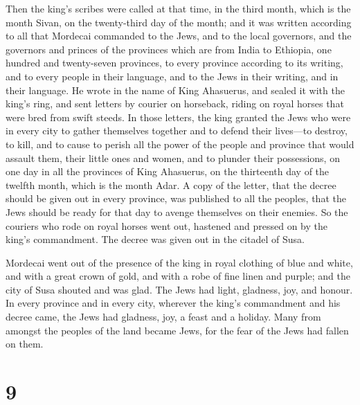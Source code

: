  Then the king's scribes were called at that time, in the
third month, which is the month Sivan, on the twenty-third day of the
month; and it was written according to all that Mordecai commanded to
the Jews, and to the local governors, and the governors and princes of
the provinces which are from India to Ethiopia, one hundred and
twenty-seven provinces, to every province according to its writing, and
to every people in their language, and to the Jews in their writing, and
in their language.  He wrote in the name of King
Ahasuerus, and sealed it with the king's ring, and sent letters by
courier on horseback, riding on royal horses that were bred from swift
steeds.  In those letters, the king granted the Jews who
were in every city to gather themselves together and to defend their
lives---to destroy, to kill, and to cause to perish all the power of the
people and province that would assault them, their little ones and
women, and to plunder their possessions,  on one day in
all the provinces of King Ahasuerus, on the thirteenth day of the
twelfth month, which is the month Adar.  A copy of the
letter, that the decree should be given out in every province, was
published to all the peoples, that the Jews should be ready for that day
to avenge themselves on their enemies.  So the couriers
who rode on royal horses went out, hastened and pressed on by the king's
commandment. The decree was given out in the citadel of Susa.

 Mordecai went out of the presence of the king in royal
clothing of blue and white, and with a great crown of gold, and with a
robe of fine linen and purple; and the city of Susa shouted and was
glad.  The Jews had light, gladness, joy, and honour.
 In every province and in every city, wherever the king's
commandment and his decree came, the Jews had gladness, joy, a feast and
a holiday. Many from amongst the peoples of the land became Jews, for
the fear of the Jews had fallen on them.

\hypertarget{section-8}{%
\section{9}\label{section-8}}

